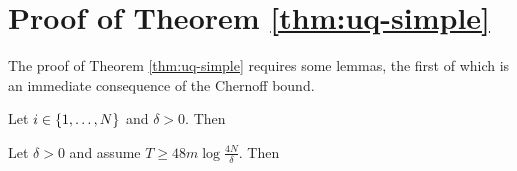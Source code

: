 

\section{Proof of Theorem \ref{thm:uq-simple}}\label{sec:thm:uq-simple}

The proof of Theorem \ref{thm:uq-simple} requires some lemmas, the first of which is an immediate consequence of the Chernoff bound.

\begin{lemma}\label{lem:conc1}
Let $i \in \left\{1,\ldots, N\right\}$ and $\delta > 0$. Then
\end{lemma}


\begin{lemma}\label{lem:m_est}
Let $\delta >0$ and assume $T \geq 48m \log\frac{4N}{\delta}$. Then
\end{lemma}

